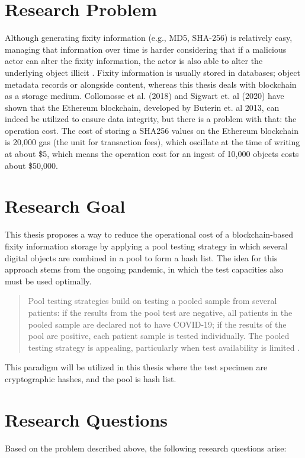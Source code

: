 \section{Research Problem}
Although generating fixity information (e.g., MD5, SHA-256) is relatively easy, managing that information over time is harder considering that if a malicious actor can alter the fixity information, the actor is also able to alter the underlying object illicit \cite[35]{kirschenbaum2010digital}. Fixity information is usually stored in databases; object metadata records or alongside content, whereas this thesis deals with blockchain as a storage medium. Collomosse et al. (2018) and Sigwart et. al (2020) have shown that the Ethereum blockchain, developed by Buterin et. al 2013, can indeed be utilized to ensure data integrity, but there is a problem with that: the operation cost. The cost of storing a SHA256 values on the Ethereum blockchain is 20,000 gas (the unit for transaction fees), which oscillate at the time of writing at about \$5, which means the operation cost for an ingest of 10,000 objects costs about \$50,000.

\section{Research Goal}
This thesis proposes a way to reduce the operational cost of a blockchain-based fixity information storage by applying a pool testing strategy in which several digital objects are combined in a pool to form a hash list. The idea for this approach stems from the ongoing pandemic, in which the test capacities also must be used optimally.
\begin{quote}
Pool testing strategies build on testing a pooled sample from several patients: if the results from the pool test are negative, all patients in the pooled sample are declared not to have COVID-19; if the results of the pool are positive, each patient sample is tested individually. The pooled testing strategy is appealing, particularly when test availability is limited \cite[1]{cherif2020simulation}.
\end{quote}
This paradigm will be utilized in this thesis where the test specimen are cryptographic hashes, and the pool is hash list.

\section{Research Questions}
Based on the problem described above, the following research questions arise:

